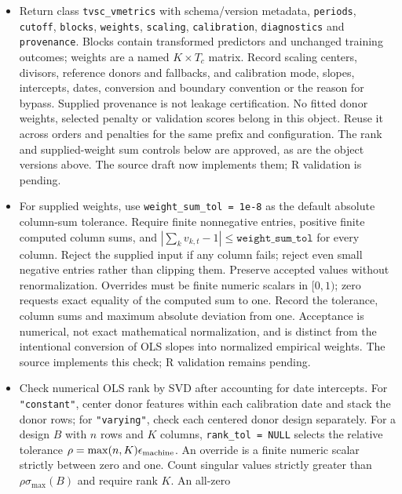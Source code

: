\documentclass[11pt]{article}
\begin{document}
\begin{itemize}
Require \texttt{scales} for custom scaling and \texttt{NULL} otherwise.
Outcome-only inputs use \texttt{"uniform"} with $V_t=[1]$ and recorded
calibration bypass; reject explicit \texttt{"constant"} or
\texttt{"varying"} requests rather than silently ignoring them.
\item Return class \texttt{tvsc\_vmetrics} with schema/version metadata,
\texttt{periods}, \texttt{cutoff}, \texttt{blocks}, \texttt{weights},
\texttt{scaling}, \texttt{calibration}, \texttt{diagnostics} and
\texttt{provenance}. Blocks contain transformed predictors and unchanged
training outcomes; weights are a named $K\times T_c$ matrix. Record
scaling centers, divisors, reference donors and fallbacks, and calibration
mode, slopes, intercepts, dates, conversion and boundary convention or
the reason for bypass. Supplied provenance is not leakage certification.
No fitted donor weights, selected penalty or validation scores belong in
this object. Reuse it across orders and penalties for the same prefix and
configuration. The rank and supplied-weight sum controls below are
approved, as are the object versions above. The source draft now implements
them; R validation is pending.
\item For supplied weights, use \texttt{weight\_sum\_tol = 1e-8} as
the default absolute column-sum tolerance. Require finite nonnegative
entries, positive finite computed column sums, and
$|\sum_k v_{k,t}-1|\leq\texttt{weight\_sum\_tol}$ for every column.
Reject the supplied input if any column fails; reject even small negative
entries rather than clipping them. Preserve accepted values without
renormalization. Overrides must be finite numeric scalars in $[0,1)$;
zero requests exact equality of the computed sum to one. Record the
tolerance, column sums and maximum absolute deviation from one.
Acceptance is numerical, not exact mathematical normalization, and is
distinct from the intentional conversion of OLS slopes into normalized
empirical weights. The source implements this check; R validation remains
pending.
\item Check numerical OLS rank by SVD after accounting for date
intercepts. For \texttt{"constant"}, center donor features within each
calibration date and stack the donor rows; for \texttt{"varying"}, check
each centered donor design separately. For a design $B$ with $n$ rows and
$K$ columns, \texttt{rank\_tol = NULL} selects the relative tolerance
$\rho=\max(n,K)\epsilon_{\rm machine}$. An override is a finite numeric
scalar strictly between zero and one. Count singular values strictly
greater than $\rho\sigma_{\max}(B)$ and require rank $K$. An all-zero

\end{itemize}
\end{document}
